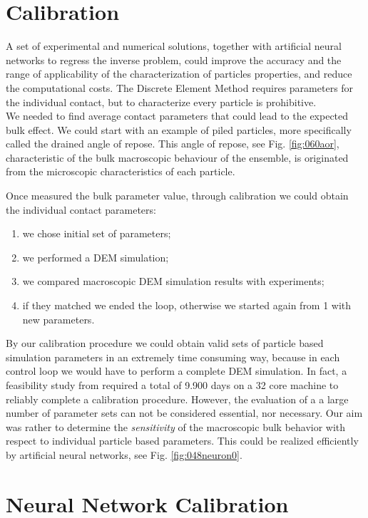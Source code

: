 \section{Calibration}
\label{sec:calibration}

A set of experimental and numerical solutions, together with artificial neural
networks to regress the inverse problem, could improve the accuracy and the
range of applicability of the characterization of particles properties, and reduce the computational costs.
The Discrete Element Method requires parameters for the individual contact, but
to characterize every particle is prohibitive.\\
We needed to find average contact parameters that could lead to the expected
bulk effect.
We could start with an example of piled particles, more specifically called the
drained angle of repose. This angle of repose, see Fig. \ref{fig:060aor},
characteristic of the bulk macroscopic behaviour of the ensemble, is originated from the microscopic
characteristics of each particle.

Once measured the bulk parameter value, through calibration we could obtain the
individual contact parameters:
\begin{enumerate}
\item{we chose initial set of parameters;}
\item{we performed a \acs{DEM} simulation;}
\item{we compared macroscopic \acs{DEM} simulation results with experiments;}
\item{if they matched we ended the loop, otherwise we started again from 1 with
new parameters.}
\end{enumerate}
By our calibration procedure we could obtain valid sets of particle based
simulation parameters in an extremely time consuming way, because in each
control loop we would have to perform a complete \acs{DEM} simulation.
In fact, a feasibility study from \citet{RefWorks:173}
required a total of
9.900 days on a 32 core machine to reliably complete a calibration procedure.
However, the evaluation of a a large number of parameter sets can not be
considered essential, nor necessary. 
Our aim was rather to determine the \textit{sensitivity} 
of the macroscopic bulk behavior with respect to individual particle based parameters.
This could be realized efficiently by artificial neural networks, see Fig.
\ref{fig:048neuron0}. 

\section{Neural Network Calibration}
\label{sec:neuralnetworkcalibration}

